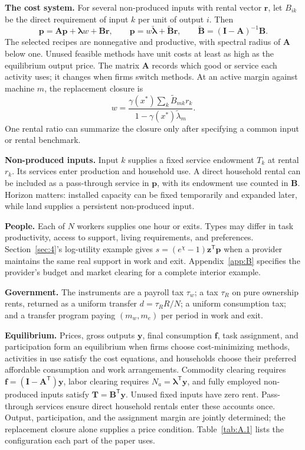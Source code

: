 \documentclass[12pt]{article}
\theoremstyle{plain}
\begin{document}
\textbf{The cost system.} For several non-produced inputs with rental vector $\mathbf{r}$, let $B_{ik}$ be the direct requirement of input $k$ per unit of output $i$. Then
\[
\mathbf{p}=\mathbf{A}\mathbf{p}+\boldsymbol{\lambda}w+\mathbf{B}\mathbf{r},\qquad
\mathbf{p}=w\widetilde{\boldsymbol{\lambda}}+\widetilde{\mathbf{B}}\mathbf{r},\qquad
\widetilde{\mathbf{B}}=(\mathbf{I}-\mathbf{A})^{-1}\mathbf{B}.
\]
The selected recipes are nonnegative and productive, with spectral radius of $\mathbf{A}$ below one. Unused feasible methods have unit costs at least as high as the equilibrium output price. The matrix $\mathbf{A}$ records which good or service each activity uses; it changes when firms switch methods. At an active margin against machine $m$, the replacement closure is
\[
w=\frac{\gamma(x^*)\sum_k\widetilde{B}_{mk}r_k}{1-\gamma(x^*)\widetilde{\lambda}_m}.
\]
One rental ratio can summarize the closure only after specifying a common input or rental benchmark.

\textbf{Non-produced inputs.} Input $k$ supplies a fixed service endowment $T_k$ at rental $r_k$. Its services enter production and household use. A direct household rental can be included as a pass-through service in $\mathbf{p}$, with its endowment use counted in $\mathbf{B}$. Horizon matters: installed capacity can be fixed temporarily and expanded later, while land supplies a persistent non-produced input.

\textbf{People.} Each of $N$ workers supplies one hour or exits. Types may differ in task productivity, access to support, living requirements, and preferences. Section~\ref{sec:4}'s log-utility example gives $s=(e^\chi-1)\mathbf{z}^{\mathsf{T}}\mathbf{p}$ when a provider maintains the same real support in work and exit. Appendix~\ref{app:B} specifies the provider's budget and market clearing for a complete interior example.

\textbf{Government.} The instruments are a payroll tax $\tau_w$; a tax $\tau_R$ on pure ownership rents, returned as a uniform transfer $d=\tau_RR/N$; a uniform consumption tax; and a transfer program paying $(m_w,m_e)$ per period in work and exit.

\textbf{Equilibrium.} Prices, gross outputs $\mathbf{y}$, final consumption $\mathbf{f}$, task assignment, and participation form an equilibrium when firms choose cost-minimizing methods, activities in use satisfy the cost equations, and households choose their preferred affordable consumption and work arrangements. Commodity clearing requires $\mathbf{f}=(\mathbf{I}-\mathbf{A}^{\mathsf{T}})\mathbf{y}$, labor clearing requires $N_a=\boldsymbol{\lambda}^{\mathsf{T}}\mathbf{y}$, and fully employed non-produced inputs satisfy $\mathbf{T}=\mathbf{B}^{\mathsf{T}}\mathbf{y}$. Unused fixed inputs have zero rent. Pass-through services ensure direct household rentals enter these accounts once. Output, participation, and the assignment margin are jointly determined; the replacement closure alone supplies a price condition. Table~\ref{tab:A.1} lists the configuration each part of the paper uses.
\end{document}
